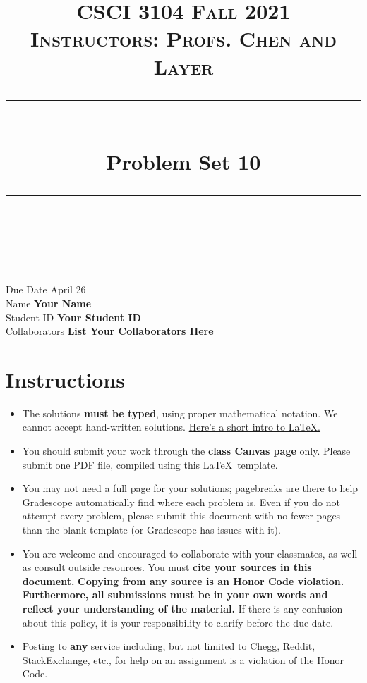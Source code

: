 \documentclass[11pt]{article}
\title{
\normalfont \normalsize 
\textsc{CSCI 3104 Fall 2021 \\ 
Instructors: Profs. Chen and Layer} \\
[10pt] 
\rule{\linewidth}{0.5pt} \\[6pt] 
\huge Problem Set 10 \\
\rule{\linewidth}{2pt}  \\[10pt]
}
\date{}
\theoremstyle{definition}
\theoremstyle{definition}
\theoremstyle{definition}
\begin{document}
\maketitle


\noindent
Due Date \dotfill April 26 \\
Name \dotfill \textbf{Your Name} \\
Student ID \dotfill \textbf{Your Student ID} \\
Collaborators \dotfill \textbf{List Your Collaborators Here}

\tableofcontents

\section{Instructions}
 \begin{itemize}
	\item The solutions \textbf{must be typed}, using proper mathematical notation. We cannot accept hand-written solutions. \href{http://ece.uprm.edu/~caceros/latex/introduction.pdf}{Here's a short intro to \LaTeX.}
	\item You should submit your work through the \textbf{class Canvas page} only. Please submit one PDF file, compiled using this \LaTeX \ template.
	\item You may not need a full page for your solutions; pagebreaks are there to help Gradescope automatically find where each problem is. Even if you do not attempt every problem, please submit this document with no fewer pages than the blank template (or Gradescope has issues with it).

	\item You are welcome and encouraged to collaborate with your classmates, as well as consult outside resources. You must \textbf{cite your sources in this document.} \textbf{Copying from any source is an Honor Code violation. Furthermore, all submissions must be in your own words and reflect your understanding of the material.} If there is any confusion about this policy, it is your responsibility to clarify before the due date. 

	\item Posting to \textbf{any} service including, but not limited to Chegg, Reddit, StackExchange, etc., for help on an assignment is a violation of the Honor Code.
\end{itemize}
\end{document}
